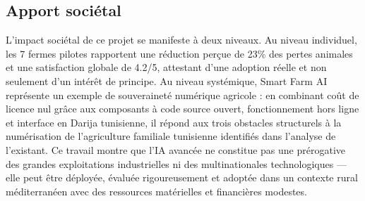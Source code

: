 \subsection*{Apport sociétal}
L'impact sociétal de ce projet se manifeste à deux niveaux. Au niveau
individuel, les 7 fermes pilotes rapportent une réduction perçue de 23\%
des pertes animales et une satisfaction globale de 4.2/5, attestant d'une
adoption réelle et non seulement d'un intérêt de principe. Au niveau systémique,
Smart Farm AI représente un exemple de souveraineté numérique agricole :
en combinant coût de licence nul grâce aux composants à code source ouvert, fonctionnement hors ligne et interface
en Darija tunisienne, il répond aux trois obstacles structurels à la
numérisation de l'agriculture familiale tunisienne identifiés dans l'analyse
de l'existant. Ce travail montre que l'IA avancée ne constitue pas une prérogative
des grandes exploitations industrielles ni des multinationales technologiques —
elle peut être déployée, évaluée rigoureusement et adoptée dans un contexte
rural méditerranéen avec des ressources matérielles et financières modestes.

